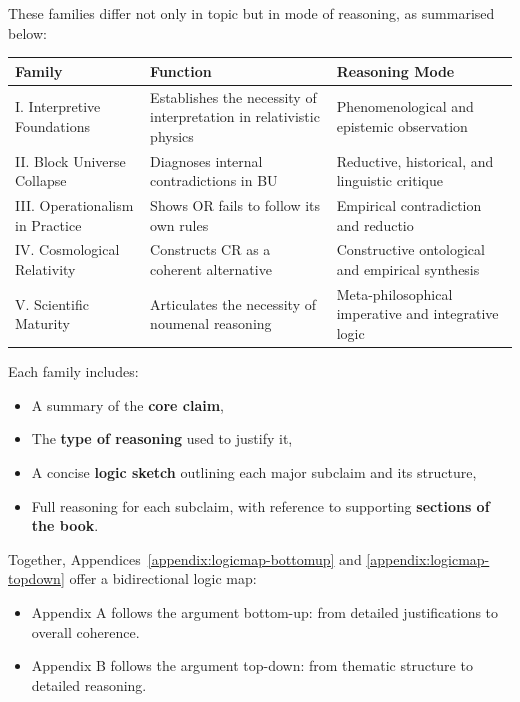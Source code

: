 \documentclass[12pt]{book}
\begin{document}
These families differ not only in topic but in mode of reasoning, as summarised below:

\begin{center}
\renewcommand{\arraystretch}{1.2}
\begin{tabular}{|p{3.2cm}|p{4.8cm}|p{6.3cm}|}
\hline
\textbf{Family} & \textbf{Function} & \textbf{Reasoning Mode} \\
\hline
I. Interpretive Foundations & Establishes the necessity of interpretation in relativistic physics & Phenomenological and epistemic observation \\
\hline
II. Block Universe Collapse & Diagnoses internal contradictions in BU & Reductive, historical, and linguistic critique \\
\hline
III. Operationalism in Practice & Shows OR fails to follow its own rules & Empirical contradiction and reductio \\
\hline
IV. Cosmological Relativity & Constructs CR as a coherent alternative & Constructive ontological and empirical synthesis \\
\hline
V. Scientific Maturity & Articulates the necessity of noumenal reasoning & Meta-philosophical imperative and integrative logic \\
\hline
\end{tabular}
\end{center}

Each family includes:
\begin{itemize}
    \item A summary of the \textbf{core claim},
    \item The \textbf{type of reasoning} used to justify it,
    \item A concise \textbf{logic sketch} outlining each major subclaim and its structure,
    \item Full reasoning for each subclaim, with reference to supporting \textbf{sections of the book}.
\end{itemize}

Together, Appendices~\ref{appendix:logicmap-bottomup} and \ref{appendix:logicmap-topdown} offer a bidirectional logic map:
\begin{itemize}
    \item Appendix A follows the argument bottom-up: from detailed justifications to overall coherence.
    \item Appendix B follows the argument top-down: from thematic structure to detailed reasoning.
\end{itemize}
\end{document}
